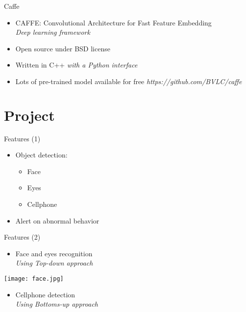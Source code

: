 \documentclass{beamer}
\begin{document}
\begin{frame}{Caffe}
    \begin{itemize}
        \item CAFFE: Convolutional Architecture for Fast Feature Embedding  \\
            \hspace{0.27cm}\textit{Deep learning framework}
        \item Open source under BSD license
        \item Written in C++
            \hspace{0.27cm}\textit{with a Python interface}
        \item Lots of pre-trained model available for free
            \hspace{0.27cm}\textit{https://github.com/BVLC/caffe}
    \end{itemize}
\end{frame}

\section{Project}
\begin{frame}{Features (1)}
    \begin{itemize}
        \item Object detection:
            \begin{itemize}
                \item Face
                \item Eyes
                \item Cellphone
            \end{itemize}
        \item Alert on abnormal behavior
    \end{itemize}
\end{frame}

\begin{frame}{Features (2)}
    \begin{itemize}
        \item Face and eyes recognition \\
            \hspace{0.27cm}\textit{Using Top-down approach}
    \end{itemize}
            \begin{center}
                \texttt{[image: face.jpg]}
            \end{center}
    \begin{itemize}
        \item Cellphone detection \\
            \hspace{0.27cm}\textit{Using Bottoms-up approach}
    \end{itemize}
\end{frame}
\end{document}
